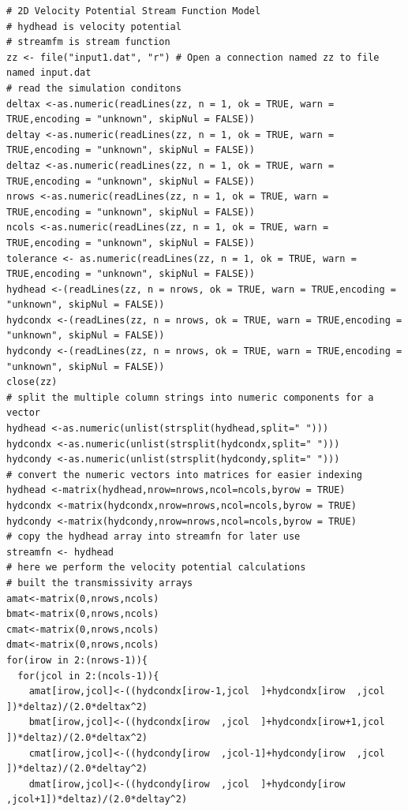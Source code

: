 \begin{lstlisting}[caption= R code demonstrating an Velocity Potential (Aquifer Head) Simulator for 2D Steady Flow.  This code fragment implements the contour plotting \\ , label=lst:velocitypotential]
# 2D Velocity Potential Stream Function Model
# hydhead is velocity potential
# streamfm is stream function
zz <- file("input1.dat", "r") # Open a connection named zz to file named input.dat
# read the simulation conditons
deltax <-as.numeric(readLines(zz, n = 1, ok = TRUE, warn = TRUE,encoding = "unknown", skipNul = FALSE))
deltay <-as.numeric(readLines(zz, n = 1, ok = TRUE, warn = TRUE,encoding = "unknown", skipNul = FALSE))
deltaz <-as.numeric(readLines(zz, n = 1, ok = TRUE, warn = TRUE,encoding = "unknown", skipNul = FALSE))
nrows <-as.numeric(readLines(zz, n = 1, ok = TRUE, warn = TRUE,encoding = "unknown", skipNul = FALSE))
ncols <-as.numeric(readLines(zz, n = 1, ok = TRUE, warn = TRUE,encoding = "unknown", skipNul = FALSE))
tolerance <- as.numeric(readLines(zz, n = 1, ok = TRUE, warn = TRUE,encoding = "unknown", skipNul = FALSE))
hydhead <-(readLines(zz, n = nrows, ok = TRUE, warn = TRUE,encoding = "unknown", skipNul = FALSE))
hydcondx <-(readLines(zz, n = nrows, ok = TRUE, warn = TRUE,encoding = "unknown", skipNul = FALSE))
hydcondy <-(readLines(zz, n = nrows, ok = TRUE, warn = TRUE,encoding = "unknown", skipNul = FALSE))
close(zz)
# split the multiple column strings into numeric components for a vector
hydhead <-as.numeric(unlist(strsplit(hydhead,split=" ")))
hydcondx <-as.numeric(unlist(strsplit(hydcondx,split=" ")))
hydcondy <-as.numeric(unlist(strsplit(hydcondy,split=" ")))
# convert the numeric vectors into matrices for easier indexing
hydhead <-matrix(hydhead,nrow=nrows,ncol=ncols,byrow = TRUE)
hydcondx <-matrix(hydcondx,nrow=nrows,ncol=ncols,byrow = TRUE)
hydcondy <-matrix(hydcondy,nrow=nrows,ncol=ncols,byrow = TRUE)
# copy the hydhead array into streamfn for later use
streamfn <- hydhead
# here we perform the velocity potential calculations
# built the transmissivity arrays
amat<-matrix(0,nrows,ncols) 
bmat<-matrix(0,nrows,ncols) 
cmat<-matrix(0,nrows,ncols)
dmat<-matrix(0,nrows,ncols)
for(irow in 2:(nrows-1)){
  for(jcol in 2:(ncols-1)){
    amat[irow,jcol]<-((hydcondx[irow-1,jcol  ]+hydcondx[irow  ,jcol  ])*deltaz)/(2.0*deltax^2)
    bmat[irow,jcol]<-((hydcondx[irow  ,jcol  ]+hydcondx[irow+1,jcol  ])*deltaz)/(2.0*deltax^2)
    cmat[irow,jcol]<-((hydcondy[irow  ,jcol-1]+hydcondy[irow  ,jcol  ])*deltaz)/(2.0*deltay^2)
    dmat[irow,jcol]<-((hydcondy[irow  ,jcol  ]+hydcondy[irow  ,jcol+1])*deltaz)/(2.0*deltay^2)

\end{lstlisting}
